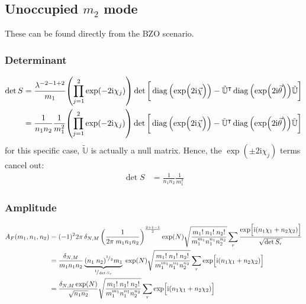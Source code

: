 \documentclass[
	english,
	a4paper,
	fontsize=10pt,
	parskip=half,
	titlepage=true,
	DIV=12,
	final
]{scrreprt}
\newcommand*{\smallfrac}  [2]{\ensuremath{{}^        {#1} \!/_        {#2}}}
\newcommand*{\transp}{\ensuremath{^\intercal}}
\newcommand*{\iunit}{\ensuremath{\mathrm{i}}}
\DeclareMathOperator{\diag}{diag}
\begin{document}
\subsection{Unoccupied $m_2$ mode}
These can be found directly from the BZO scenario.

\subsubsection{Determinant}
\begin{align}
	\det S
&=
	\frac{ \lambda^{-2 - 1 + 2} }{ m_1 }
	\qty( \prod_{j=1}^{2} \exp(-2\iunit \chi_j) )
	\det\qty[\bigg.
		\diag\qty(\exp(\Big.2\iunit\vec{\chi}))
		-
		\tilde{\mathbb{U}}\transp
		\diag\qty(\exp(2\iunit\vec{\theta}))
		\tilde{\mathbb{U}}
	] \\
&=
	\frac{1}{n_1 n_2}
	\frac{1}{m_1^{2}}
	\qty( \prod_{j=1}^{2} \exp(-2\iunit \chi_j) )
	\det\qty[\bigg.
		\diag\qty(\exp(\Big.2\iunit\vec{\chi}))
		-
		\tilde{\mathbb{U}}\transp
		\diag\qty(\exp(2\iunit\vec{\theta}))
		\tilde{\mathbb{U}}
	]
\end{align}
for this specific case, $\tilde{\mathbb{U}}$ is actually a null matrix. Hence, the 
$\exp(\pm 2\iunit \chi_j)$ terms cancel out:
\begin{align}
	\det S
&=
	\frac{1}{n_1 n_2}
	\frac{1}{m_1^{2}}
\end{align}

\subsubsection{Amplitude}
\begin{align}
\nonumber
	A_F(m_1, n_1, n_2)
&=
	(-1)^2
	2\pi \, \delta_{N,M} \, \qty(
		\frac{1}{2\pi \; m_1 n_1 n_2}
	)^{\frac{2+1-1}{2}}
	\exp(N)
	\sqrt{\frac
		{ m_1! \; n_1! \; n_2! }
		{ m_1^{m_1} n_1^{n_1} n_2^{n_2} }
	}
	\sum_r
		\frac
		{\exp[ \Big.
			\iunit \qty( 
			n_1 \chi_1 + n_2 \chi_2)
		]}
		{\sqrt{\det S_r}} \\
\nonumber
&=
	\frac
		{\delta_{N,M}}
		{m_1 n_1 n_2}
	\underbrace{
		(n_1 \; n_2)^{\smallfrac{1}{2}} m_1
	}_{\smallfrac{1}{\det S_r}} \;
	\exp(N)
	\sqrt{\frac
		{ m_1! \; n_1! \; n_2! }
		{ m_1^{m_1} n_1^{n_1} n_2^{n_2} }
	}
	\sum_r
		\exp[ \Big.
			\iunit \qty(  
			n_1 \chi_1 + n_2 \chi_2)
		]
	\\
&=
	\frac
		{\delta_{N,M} \exp(N)}
		{\sqrt{n_1 n_2}}
	\sqrt{\frac
		{ m_1! \; n_1! \; n_2! }
		{ m_1^{m_1} n_1^{n_1} n_2^{n_2} }
	}
	\sum_r
		\exp[ \Big.
			\iunit \qty(  
			n_1 \chi_1 + n_2 \chi_2)
		]
\end{align}
\end{document}

